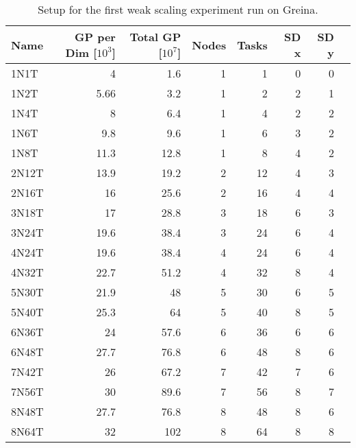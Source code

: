 \begin{table}[!htbp]
\centering
{}
\begin{tabular}{l r r r r r r r}
\toprule
Name & GP per Dim [$10^3$] & Total GP [$10^7$] & Nodes & Tasks & SD x & SD y \\
\midrule
1N1T	&	4	&	1.6	&	1	&	1	&	0	&	0	\\
1N2T	&	5.66	&	3.2	&	1	&	2	&	2	&	1	\\
1N4T	&	8	&	6.4	&	1	&	4	&	2	&	2	\\
1N6T	&	9.8	&	9.6	&	1	&	6	&	3	&	2	\\
1N8T	&	11.3	&	12.8	&	1	&	8	&	4	&	2	\\
2N12T	&	13.9	&	19.2	&	2	&	12	&	4	&	3	\\
2N16T	&	16	&	25.6	&	2	&	16	&	4	&	4	\\
3N18T	&	17	&	28.8	&	3	&	18	&	6	&	3	\\
3N24T	&	19.6	&	38.4	&	3	&	24	&	6	&	4	\\
4N24T	&	19.6	&	38.4	&	4	&	24	&	6	&	4	\\
4N32T	&	22.7	&	51.2	&	4	&	32	&	8	&	4	\\
5N30T	&	21.9	&	48	&	5	&	30	&	6	&	5	\\
5N40T	&	25.3	&	64	&	5	&	40	&	8	&	5	\\
6N36T	&	24	&	57.6	&	6	&	36	&	6	&	6	\\
6N48T	&	27.7	&	76.8	&	6	&	48	&	8	&	6	\\
7N42T	&	26	&	67.2	&	7	&	42	&	7	&	6	\\
7N56T	&	30	&	89.6	&	7	&	56	&	8	&	7	\\
8N48T	&	27.7	&	76.8	&	8	&	48	&	8	&	6	\\
8N64T	&	32	&	102	&	8	&	64	&	8	&	8	\\
\bottomrule
\end{tabular}
\caption{Setup for the first weak scaling experiment run on Greina.}
\label{tab:weak_4k}
\end{table}

